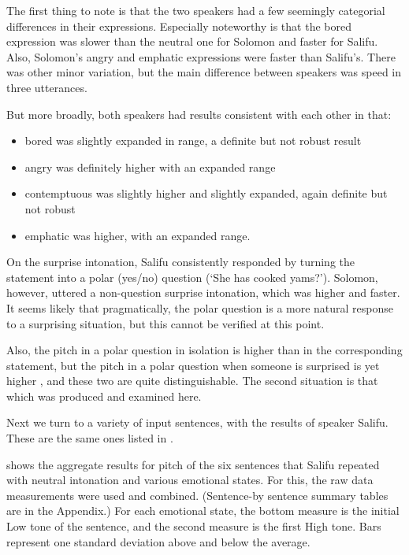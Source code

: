 \documentclass[output=paper]{langsci/langscibook}
\begin{document}
The first thing to note is that the two speakers had a few seemingly categorial differences in their expressions. Especially noteworthy is that the bored expression was slower than the neutral one for Solomon and faster for Salifu. Also, Solomon's angry and emphatic expressions were faster than Salifu's. There was other minor variation, but the main difference between speakers was speed in three utterances.

But more broadly, both speakers had results consistent with each other in that:

\begin{itemize}[noitemsep]
\item bored was slightly expanded in range, a definite but not robust result
\item angry was definitely higher with an expanded range
\item contemptuous was slightly higher and slightly expanded, again definite but not robust
\item emphatic was higher, with an expanded range. 
\end{itemize}

On the surprise intonation, Salifu consistently responded by turning the statement into a polar (yes/no) question (`She has cooked yams?'). Solomon, however, uttered a non-question surprise intonation, which was higher and faster. It seems likely that pragmatically, the polar question is a more natural response to a surprising situation, but this cannot be verified at this point. 

Also, the pitch in a polar question in isolation is higher than in the corresponding statement, but the pitch in a polar question when someone is surprised is yet higher \citep{cahill2012}, and these two are quite distinguishable. The second situation is that which was produced and examined here.


Next we turn to a variety of input sentences, with the results of speaker Salifu. These are the same ones listed in .


 shows the aggregate results for pitch of the six sentences that Salifu repeated with neutral intonation and various emotional states. For this, the raw data measurements were used and combined. (Sentence-by sentence summary tables are in the Appendix.) For each emotional state, the bottom measure is the initial Low tone of the sentence, and the second measure is the first High tone. Bars represent one standard deviation above and below the average.
\end{document}
